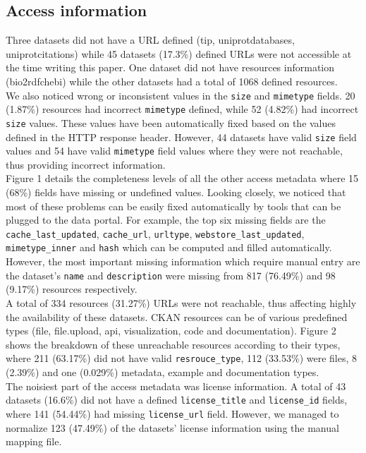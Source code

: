 \documentclass[runningheads,a4paper]{llncs}
\begin{document}
\subsection{Access information} Three datasets did not have a URL defined (tip, uniprot\-databases, uniprot\-citations) while 45 datasets (17.3\%) defined URLs were not accessible at the time writing this paper. One dataset did not have resources information (bio2rdf\-chebi) while the other datasets had a total of 1068 defined resources.\\
We also noticed wrong or inconsistent values in the \texttt{size} and \texttt{mimetype} fields. 20 (1.87\%) resources had incorrect \texttt{mimetype} defined, while 52 (4.82\%) had incorrect \texttt{size} values. These values have been automatically fixed based on the values defined in the HTTP response header. However, 44 datasets have valid \texttt{size} field values and 54 have valid \texttt{mimetype} field values where they were not reachable, thus providing incorrect information.\\
Figure 1 details the completeness levels of all the other access metadata where 15 (68\%) fields have missing or undefined values. Looking closely, we noticed that most of these problems can be easily fixed automatically by tools that can be plugged to the data portal. For example, the top six missing fields are the \texttt{cache\_last\_updated}, \texttt{cache\_url}, \texttt{url\-type}, \texttt{webstore\_last\_updated}, \texttt{mimetype\-\_inner} and \texttt{hash} which can be computed and filled automatically. However, the most important missing information which require manual entry are the dataset's \texttt{name} and \texttt{description} were missing from 817 (76.49\%) and 98 (9.17\%) resources respectively.\\
A total of 334 resources (31.27\%) URLs were not reachable, thus affecting highly the availability of these datasets. CKAN resources can be of various predefined types (file, file.upload, api, visualization, code and documentation). Figure 2 shows the breakdown of these unreachable resources according to their types, where 211 (63.17\%) did not have valid \texttt{resrouce\_type}, 112 (33.53\%) were files, 8 (2.39\%) and one (0.029\%) metadata, example and documentation types.\\
The noisiest part of the access metadata was license information. A total of 43 datasets (16.6\%) did not have a defined \texttt{license\_title} and \texttt{license\_id} fields, where 141 (54.44\%) had missing \texttt{license\_url} field. However, we managed to normalize 123 (47.49\%) of the datasets' license information using the manual mapping file.
\end{document}
